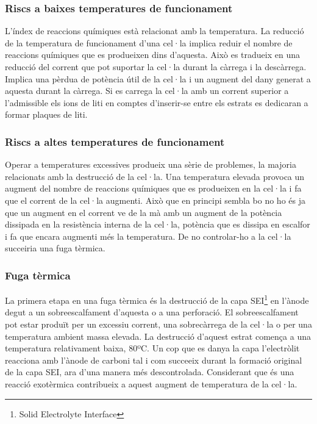 \subsubsection{Riscs a baixes temperatures de funcionament}
L'índex de reaccions químiques està relacionat amb la temperatura. \newline La reducció de la temperatura de funcionament d'una cel·la implica reduir el nombre de reaccions químiques que es produeixen dins d'aquesta. Això es tradueix en una reducció del corrent que pot suportar la cel·la durant la càrrega i la descàrrega. Implica una pèrdua de potència útil de la cel·la i un augment del dany generat a aquesta durant la càrrega. Si es carrega la cel·la amb un corrent superior a l'admissible els ions de liti en comptes d'inserir-se entre els estrats es dedicaran a formar plaques de liti.


\subsubsection{Riscs a altes temperatures de funcionament}
Operar a temperatures excessives produeix una sèrie de problemes, la majoria relacionats amb la destrucció de la cel·la. Una temperatura elevada provoca un augment del nombre de reaccions químiques que es produeixen en la cel·la i fa que el corrent de la cel·la augmenti. Això que en principi sembla bo no ho és ja que un augment en el corrent ve de la mà amb un augment de la potència dissipada en la resistència interna de la cel·la, potència que es dissipa en escalfor i fa que encara augmenti més la temperatura. De no controlar-ho a la cel·la succeiria una fuga tèrmica.

\subsubsection{Fuga tèrmica}
La primera etapa en una fuga tèrmica és la destrucció de la capa SEI\footnote{Solid Electrolyte Interface} en l'ànode degut a un sobreescalfament d'aquesta o a una perforació. El sobreescalfament pot estar produït per un excessiu corrent, una sobrecàrrega de la cel·la o per una temperatura ambient massa elevada. La destrucció d'aquest estrat comença a una temperatura relativament baixa, 80ºC. Un cop que es danya la capa l'electròlit reacciona amb l'ànode de carboni tal i com succeeix durant la formació original de la capa SEI, ara d'una manera més descontrolada. Considerant que és una reacció exotèrmica contribueix a aquest augment de temperatura de la cel·la. 

